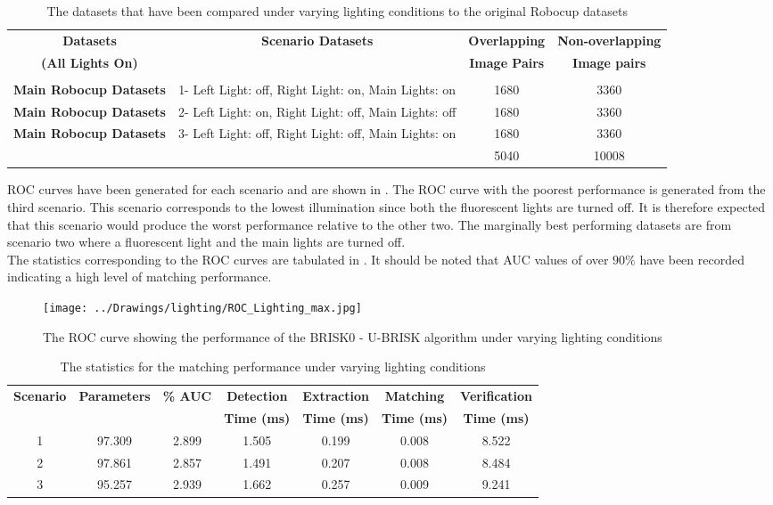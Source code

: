 \documentclass[11pt]{report}
\begin{document}
\begin{table}
\caption{The datasets that have been compared under varying lighting conditions
to the original Robocup datasets}
\footnotesize
\begin{tabular}{|c|c|c|c|}
\hline 
\textbf{Datasets} & \textbf{Scenario Datasets} & \textbf{Overlapping } & \textbf{Non-overlapping }\tabularnewline
\textbf{(All Lights On)} &  & \textbf{Image Pairs} & \textbf{Image pairs}\tabularnewline
\hline 
\hline 
 &  &  & \tabularnewline
\hline 
\textbf{Main Robocup Datasets} & 1- Left Light: off, Right Light: on, Main Lights: on & 1680 & 3360\tabularnewline
\hline 
\textbf{Main Robocup Datasets} & 2- Left Light: on, Right Light: off, Main Lights: off & 1680 & 3360\tabularnewline
\hline 
\textbf{Main Robocup Datasets} & 3- Left Light: off, Right Light: off, Main Lights: on & 1680 & 3360\tabularnewline
\hline 
 &  & 5040 & 10008\tabularnewline
\hline 
\end{tabular}
\label{tab:datasetLighting}
\end{table}

ROC curves have been generated for each scenario and are shown in . The ROC curve with the poorest performance is generated from the third scenario. This scenario corresponds to the lowest illumination since both the fluorescent lights are turned off. It is therefore expected that this scenario would produce the worst performance relative to the other two. The marginally best performing datasets are from scenario two where a fluorescent light and the main lights are turned off. \\

The statistics corresponding to the ROC curves are tabulated in . It should be noted that AUC values of over $90\%$ have been recorded indicating a high level of matching performance. \\


\begin{figure}[h!] 
  \centering
    \texttt{[image: ../Drawings/lighting/ROC\_Lighting\_max.jpg]}
    \caption{The ROC curve showing the performance of the BRISK0 - U-BRISK algorithm under varying lighting conditions}
    \label{fig:rocLighting}
\end{figure}

\begin{table}
\caption{The statistics for the matching performance under varying lighting conditions}
\footnotesize
\begin{tabular}{|c|c|c|c|c|c|c|}
\hline 
\textbf{Scenario} & \textbf{Parameters} & \textbf{\% AUC} & \textbf{Detection} & \textbf{Extraction} & \textbf{Matching} & \textbf{Verification}\tabularnewline
 &  &  & \textbf{Time (ms)} & \textbf{Time (ms)} & \textbf{Time (ms)} & \textbf{Time (ms)}\tabularnewline
\hline 
\hline 
1 & 97.309 & 2.899 & 1.505 & 0.199 & 0.008 & 8.522\tabularnewline
\hline 
2 & 97.861 & 2.857 & 1.491 & 0.207 & 0.008 & 8.484\tabularnewline
\hline 
3 & 95.257 & 2.939 & 1.662 & 0.257 & 0.009 & 9.241\tabularnewline
\hline 
\end{tabular}
\label{tab:lightingStats}
\end{table}
\end{document}
